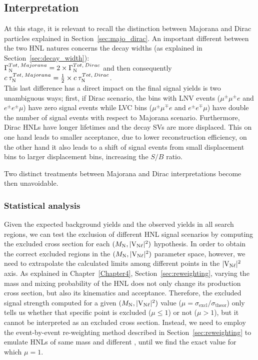 \clearpage
\subsection{Interpretation}
At this stage, it is relevant to recall the distinction between
Majorana and Dirac particles explained
in Section~\ref{sec:majo_dirac}.
An important different between the two HNL
natures concerns the decay widths (as explained
in Section~\ref{sec:decay_width}):\\
 $\Gamma^{Tot, \: Majorana}_{\mathrm{N}} = 2 \times \Gamma^{Tot, \: Dirac}_{\mathrm{N}}
$ and then consequently $c\:\tau^{Tot, \: Majorana}_{\mathrm{N}} = \frac{1}{2} \times c\:\tau^{Tot, \: Dirac}_{\mathrm{N}}
$.\\
This last difference has a direct impact on the final signal yields is
two unambiguous ways; first, if Dirac scenario, the bins with LNV events ($\mu^{\pm}\mu^{\pm} e$ and $e^{\pm}e^{\pm}\mu$)
have zero signal events while LVC bins
($\mu^{\pm}\mu^{\mp} e$ and $e^{\pm}e^{\mp}\mu$) have double the
number of signal events with respect to Majorana
scenario. Furthermore, Dirac HNLs have longer lifetimes and the decay SVs
are more displaced. This on one hand leads to smaller acceptance, due to lower
reconstruction efficiency, on the other hand it also leads to a shift of signal
events from small displacement bins to larger displacement bins,
increasing the $S/B$ ratio.

Two distinct treatments between
Majorana and Dirac interpretations become then
unavoidable. 
\subsubsection{Statistical analysis}
Given the expected background yields and the observed yields in all
search regions, we can test the exclusion of different HNL signal 
scenarios by computing the excluded cross section
for each $(M_{\mathrm{N}},\mathrm{|V_{\mathrm{N}\ell}|^2})$ hypothesis.
In order to obtain the correct excluded regions in the
$(M_{\mathrm{N}},\mathrm{|V_{\mathrm{N}\ell}|^2})$ parameter space, however, we need to extrapolate the
calculated limits among different points in the
$\mathrm{|V_{\mathrm{N}\ell}|^2}$ axis.
As explained in Chapter~\ref{Chapter4}, Section~\ref{sec:reweighting}, varying the mass and mixing
probability of the HNL does not only change its production cross
section, but also its kinematics and acceptance.
Therefore, the excluded signal strength computed for a given
$(M_{\mathrm{N}},\mathrm{|V_{\mathrm{N}\ell}|^2})$ value
($\mu=\sigma_{\mathrm{excl}}/\sigma_{\mathrm{theor}}$) only tells us
whether that specific point is excluded ($\mu\leq 1$) or not
($\mu>1$), but it cannot be interpreted as an excluded cross section.
Instead, we need to employ the event-by-event re-weighting method
described in Section~\ref{sec:reweighting} to emulate HNLs of same mass and
different \mixpar, until we find the exact \mixpar value for which
$\mu=1$.\\

